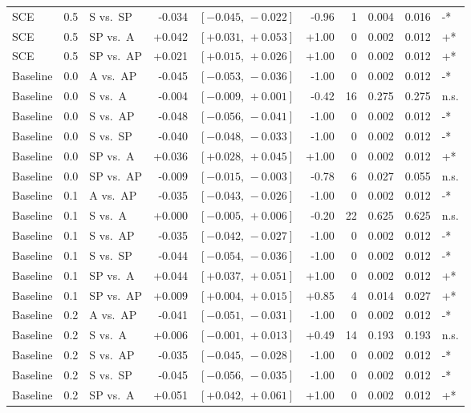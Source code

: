 \begin{landscape}
\begin{scriptsize}
\begin{longtable}{lllrrrrrrl}
SCE & 0.5 & S vs.\ SP & -0.034 & $[-0.045,\,-0.022]$ & -0.96 & 1 & 0.004 & 0.016 & -* \\
SCE & 0.5 & SP vs.\ A & +0.042 & $[+0.031,\,+0.053]$ & +1.00 & 0 & 0.002 & 0.012 & +* \\
SCE & 0.5 & SP vs.\ AP & +0.021 & $[+0.015,\,+0.026]$ & +1.00 & 0 & 0.002 & 0.012 & +* \\
Baseline & 0.0 & A vs.\ AP & -0.045 & $[-0.053,\,-0.036]$ & -1.00 & 0 & 0.002 & 0.012 & -* \\
Baseline & 0.0 & S vs.\ A & -0.004 & $[-0.009,\,+0.001]$ & -0.42 & 16 & 0.275 & 0.275 & n.s. \\
Baseline & 0.0 & S vs.\ AP & -0.048 & $[-0.056,\,-0.041]$ & -1.00 & 0 & 0.002 & 0.012 & -* \\
Baseline & 0.0 & S vs.\ SP & -0.040 & $[-0.048,\,-0.033]$ & -1.00 & 0 & 0.002 & 0.012 & -* \\
Baseline & 0.0 & SP vs.\ A & +0.036 & $[+0.028,\,+0.045]$ & +1.00 & 0 & 0.002 & 0.012 & +* \\
Baseline & 0.0 & SP vs.\ AP & -0.009 & $[-0.015,\,-0.003]$ & -0.78 & 6 & 0.027 & 0.055 & n.s. \\
Baseline & 0.1 & A vs.\ AP & -0.035 & $[-0.043,\,-0.026]$ & -1.00 & 0 & 0.002 & 0.012 & -* \\
Baseline & 0.1 & S vs.\ A & +0.000 & $[-0.005,\,+0.006]$ & -0.20 & 22 & 0.625 & 0.625 & n.s. \\
Baseline & 0.1 & S vs.\ AP & -0.035 & $[-0.042,\,-0.027]$ & -1.00 & 0 & 0.002 & 0.012 & -* \\
Baseline & 0.1 & S vs.\ SP & -0.044 & $[-0.054,\,-0.036]$ & -1.00 & 0 & 0.002 & 0.012 & -* \\
Baseline & 0.1 & SP vs.\ A & +0.044 & $[+0.037,\,+0.051]$ & +1.00 & 0 & 0.002 & 0.012 & +* \\
Baseline & 0.1 & SP vs.\ AP & +0.009 & $[+0.004,\,+0.015]$ & +0.85 & 4 & 0.014 & 0.027 & +* \\
Baseline & 0.2 & A vs.\ AP & -0.041 & $[-0.051,\,-0.031]$ & -1.00 & 0 & 0.002 & 0.012 & -* \\
Baseline & 0.2 & S vs.\ A & +0.006 & $[-0.001,\,+0.013]$ & +0.49 & 14 & 0.193 & 0.193 & n.s. \\
Baseline & 0.2 & S vs.\ AP & -0.035 & $[-0.045,\,-0.028]$ & -1.00 & 0 & 0.002 & 0.012 & -* \\
Baseline & 0.2 & S vs.\ SP & -0.045 & $[-0.056,\,-0.035]$ & -1.00 & 0 & 0.002 & 0.012 & -* \\
Baseline & 0.2 & SP vs.\ A & +0.051 & $[+0.042,\,+0.061]$ & +1.00 & 0 & 0.002 & 0.012 & +* \\

\end{longtable}
\end{scriptsize}
\end{landscape}
